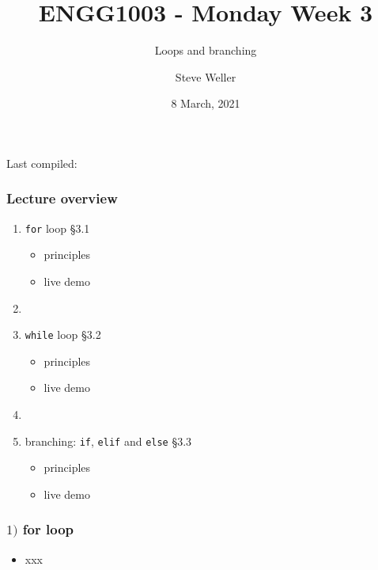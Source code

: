\documentclass[english,14pt]{beamer}
\title{ENGG1003 - Monday Week 3}
\subtitle{Loops and branching}
\author{Steve Weller}
\institute{University of Newcastle}
\date{8 March, 2021}
\newcommand\red[1]{{\color{red} #1}}
\begin{document}
\begin{flushleft}
{\scriptsize Last compiled:~\DTMnow}
\vspace*{-5mm}
\end{flushleft}
\framebreak


\begin{frame}[fragile]

\frametitle{Lecture overview}
\begin{enumerate}
	\item \texttt{for} loop \red{\S3.1}
	\begin{itemize}
		\item principles
		\item live demo
	\end{itemize}

	\item[]
	
	\item \texttt{while} loop \red{\S3.2}
		\begin{itemize}
			\item principles
			\item live demo
		\end{itemize}

	\item[]
	
	\item branching: \texttt{if}, \texttt{elif} and \texttt{else} \red{\S3.3}
		\begin{itemize}
			\item principles
			\item live demo
		\end{itemize}
		
\end{enumerate}

\end{frame}


\begin{frame}[fragile]

\frametitle{$1)$ for loop}

\begin{itemize}
	\item xxx
\end{itemize}

\end{frame}

\end{document}
